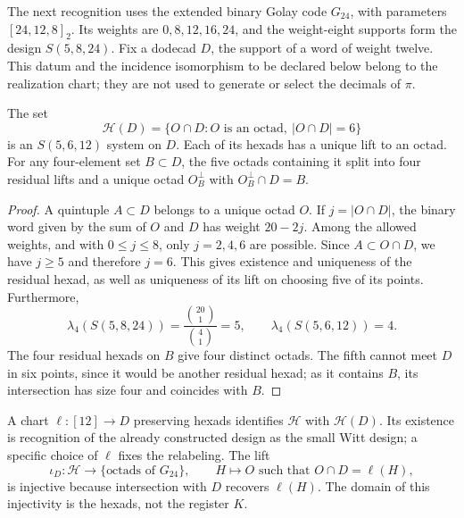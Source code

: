 The next recognition uses the extended binary Golay code
$G_{24}$, with parameters $[24,12,8]_2$. Its weights are
$0,8,12,16,24$, and the weight-eight supports form the design
$S(5,8,24)$. Fix a dodecad $D$, the support of a word of weight
twelve. This datum and the incidence isomorphism to be declared
below belong to the realization chart; they are not used to
generate or select the decimals of $\pi$.

\begin{proposition}
\label{x_reciprocidad:exc:residuo-binario}
The set
\[
 \mathcal H(D)=
 \{O\cap D: O\text{ is an octad},\ |O\cap D|=6\}
\]
is an $S(5,6,12)$ system on $D$. Each of its hexads has
a unique lift to an octad. For any four-element set $B\subset D$,
the five octads containing it split into four residual
lifts and a unique octad $O_B^\perp$ with $O_B^\perp\cap D=B$.
\end{proposition}

\begin{proof}
A quintuple $A\subset D$ belongs to a unique octad $O$. If
$j=|O\cap D|$, the binary word given by the sum of $O$ and $D$ has weight
$20-2j$. Among the allowed weights, and with $0\leq j\leq8$, only
$j=2,4,6$ are possible. Since $A\subset O\cap D$, we have $j\geq5$
and therefore $j=6$. This gives existence and uniqueness of the residual
hexad, as well as uniqueness of its lift on choosing five of its
points. Furthermore,
\[
 \lambda_4(S(5,8,24))=\frac{\binom{20}1}{\binom41}=5,
 \qquad
 \lambda_4(S(5,6,12))=4.
\]
The four residual hexads on $B$ give four distinct octads.
The fifth cannot meet $D$ in six points, since it would be another residual
hexad; as it contains $B$, its intersection has size four and
coincides with $B$.
\end{proof}

A chart $\ell:[12]\to D$ preserving hexads identifies
$\mathcal H$ with $\mathcal H(D)$. Its existence is recognition
of the already constructed design as the small Witt design; a specific choice
of $\ell$ fixes the relabeling. The lift
\[
 \iota_D:\mathcal H\longrightarrow
       \{\text{octads of }G_{24}\},
 \qquad H\longmapsto O\text{ such that }O\cap D=\ell(H),
\]
is injective because intersection with $D$ recovers $\ell(H)$.
The domain of this injectivity is the hexads, not the register $K$.

